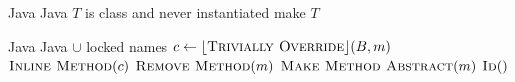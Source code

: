 \begin{algorithm}
\caption{$\refactoring{Make Type Abstract}(T : \type{Type})$}
\label{alg:MakeTypeAbstract}
\begin{algorithmic}[1]
\REQUIRE Java
\ENSURE Java
\medskip
{}
    \RETURN
\ENDIF
\STATE \assert $T$ is class and never instantiated
\STATE make $T$ 
\end{algorithmic}
\end{algorithm}

\begin{algorithm}
\caption{$\refactoring{Push Down Virtual Method}(m : \type{VirtualMethod})$}
\label{alg:PushDownVirtualMethod}
\begin{algorithmic}[1]
\REQUIRE Java
\ENSURE Java $\cup$ locked names
\medskip
{}
  \STATE $c \leftarrow \lfloor\textsc{Trivially Override}\rfloor(B, m)$
    \STATE $\textsc{Inline Method}(c)$
  \ENDIF
\ENDFOR
\STATE $\textsc{Remove Method}(m)$
\STATE \qquad\orelse$\textsc{Make Method Abstract}(m)$
\STATE \qquad\orelse$\textsc{Id}()$
\end{algorithmic}
\end{algorithm}
